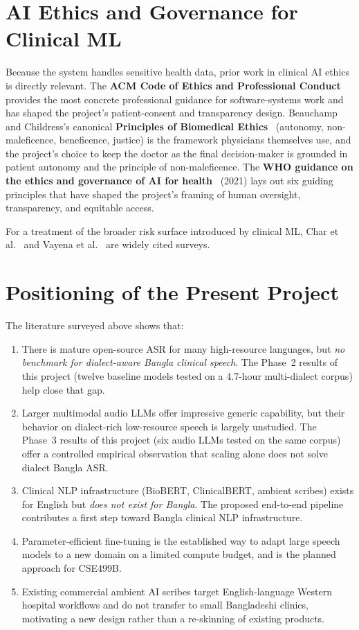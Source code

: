 \documentclass[12pt,a4paper]{article}
\begin{document}
\section{AI Ethics and Governance for Clinical ML}

Because the system handles sensitive health data, prior work in
clinical AI ethics is directly relevant. The
\textbf{ACM Code of Ethics and Professional
Conduct}~\cite{rw:acm2018} provides the most concrete professional
guidance for software-systems work and has shaped the project's
patient-consent and transparency design. Beauchamp and Childress's
canonical \textbf{Principles of Biomedical
Ethics}~\cite{rw:beauchamp} (autonomy, non-maleficence, beneficence,
justice) is the framework physicians themselves use, and the
project's choice to keep the doctor as the final decision-maker is
grounded in patient autonomy and the principle of non-maleficence.
The \textbf{WHO guidance on the ethics and governance of AI for
health}~\cite{rw:whoethics} (2021) lays out six guiding
principles that have shaped the project's framing of human
oversight, transparency, and equitable access.

For a treatment of the broader risk surface introduced by clinical
ML, Char et al.~\cite{rw:char} and Vayena et
al.~\cite{rw:vayena} are widely cited surveys.

\section{Positioning of the Present Project}

The literature surveyed above shows that:

\begin{enumerate}[leftmargin=*]
\item There is mature open-source ASR for many high-resource
languages, but \emph{no benchmark for dialect-aware Bangla clinical
speech}. The Phase~2 results of this project (twelve baseline
models tested on a 4.7-hour multi-dialect corpus) help close that
gap.
\item Larger multimodal audio LLMs offer impressive generic
capability, but their behavior on dialect-rich low-resource
speech is largely unstudied. The Phase~3 results of this project
(six audio LLMs tested on the same corpus) offer a controlled
empirical observation that scaling alone does not solve dialect
Bangla ASR.
\item Clinical NLP infrastructure (BioBERT, ClinicalBERT,
ambient scribes) exists for English but \emph{does not exist for
Bangla}. The proposed end-to-end pipeline contributes a first step
toward Bangla clinical NLP infrastructure.
\item Parameter-efficient fine-tuning is the established way to
adapt large speech models to a new domain on a limited compute
budget, and is the planned approach for CSE499B.
\item Existing commercial ambient AI scribes target English-language
Western hospital workflows and do not transfer to small
Bangladeshi clinics, motivating a new design rather than a
re-skinning of existing products.
\end{enumerate}
\end{document}
